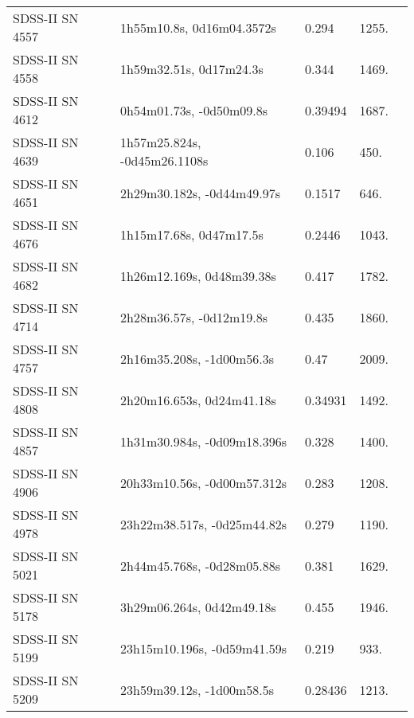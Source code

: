 \begin{longtable}{lllll}
  SDSS-II SN 4557 &      1h55m10.8s, 0d16m04.3572s &    0.294 &          1255. &    \citet{2011ApJ...738..162S} \\
  SDSS-II SN 4558 &        1h59m32.51s, 0d17m24.3s &    0.344 &          1469. &    \citet{2010ApJ...713.1026D} \\
  SDSS-II SN 4612 &       0h54m01.73s, -0d50m09.8s &  0.39494 &          1687. &    \citet{2016SDSSD.C...0000:} \\
  SDSS-II SN 4639 &   1h57m25.824s, -0d45m26.1108s &    0.106 &           450. &    \citet{2011ApJ...738..162S} \\
  SDSS-II SN 4651 &     2h29m30.182s, -0d44m49.97s &   0.1517 &           646. &    \citet{2011ApJ...738..162S} \\
  SDSS-II SN 4676 &        1h15m17.68s, 0d47m17.5s &   0.2446 &          1043. &    \citet{2011ApJ...738..162S} \\
  SDSS-II SN 4682 &      1h26m12.169s, 0d48m39.38s &    0.417 &          1782. &    \citet{2011ApJ...738..162S} \\
  SDSS-II SN 4714 &       2h28m36.57s, -0d12m19.8s &    0.435 &          1860. &    \citet{2010ApJ...713.1026D} \\
  SDSS-II SN 4757 &      2h16m35.208s, -1d00m56.3s &     0.47 &          2009. &    \citet{2011ApJ...738..162S} \\
  SDSS-II SN 4808 &      2h20m16.653s, 0d24m41.18s &  0.34931 &          1492. &    \citet{2016SDSSD.C...0000:} \\
  SDSS-II SN 4857 &    1h31m30.984s, -0d09m18.396s &    0.328 &          1400. &    \citet{2011ApJ...738..162S} \\
  SDSS-II SN 4906 &    20h33m10.56s, -0d00m57.312s &    0.283 &          1208. &    \citet{2011ApJ...738..162S} \\
  SDSS-II SN 4978 &    23h22m38.517s, -0d25m44.82s &    0.279 &          1190. &    \citet{2011ApJ...738..162S} \\
  SDSS-II SN 5021 &     2h44m45.768s, -0d28m05.88s &    0.381 &          1629. &    \citet{2011ApJ...738..162S} \\
  SDSS-II SN 5178 &      3h29m06.264s, 0d42m49.18s &    0.455 &          1946. &    \citet{2011ApJ...738..162S} \\
  SDSS-II SN 5199 &    23h15m10.196s, -0d59m41.59s &    0.219 &           933. &    \citet{2011ApJ...738..162S} \\
  SDSS-II SN 5209 &      23h59m39.12s, -1d00m58.5s &  0.28436 &          1213. &    \citet{2016SDSSD.C...0000:} \\

\end{longtable}
